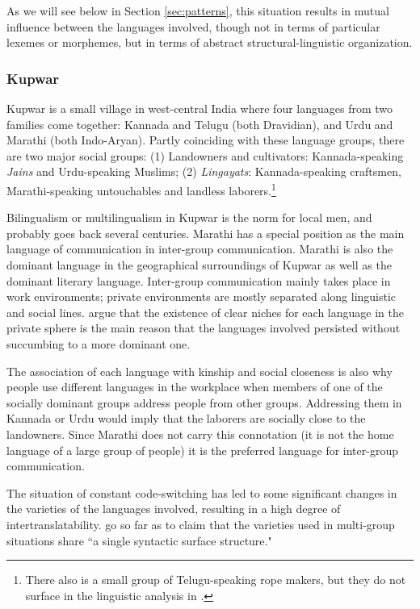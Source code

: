 \documentclass[output=paper]{langscibook}
\begin{document}
As we will see below in Section \ref{sec:patterns}, this situation results in mutual influence between the languages involved, though not in terms of particular lexemes or morphemes, but in terms of abstract structural-linguistic organization.


\subsubsection{Kupwar} \label{Kupwar processes}

Kupwar \parencite{gumperzetal1971convergence} is a small village in west-central India where four languages from two families come together: Kannada and Telugu (both Dravidian), and Urdu and Marathi (both Indo-Aryan). Partly coinciding with these language groups, there are two major social groups: (1) Landowners and cultivators: Kannada-speaking \textit{Jains} and Urdu-speaking Muslims; (2) \textit{Lingayats}: Kannada-speaking craftsmen, Marathi-speaking untouchables and landless laborers.\footnote{There also is a small group of Telugu-speaking rope makers, but they do not surface in the linguistic analysis in \citet{gumperzetal1971convergence}.}

Bilingualism or multilingualism in Kupwar is the norm for local men, and probably goes back several centuries. Marathi has a special position as the main language of communication in inter-group communication. Marathi is also the dominant language in the geographical surroundings of Kupwar as well as the dominant literary language. Inter-group communication mainly takes place in work environments; private environments are mostly separated along linguistic and social lines. \textcite{gumperzetal1971convergence} argue that the existence of clear niches for each language in the private sphere is the main reason that the languages involved persisted without succumbing to a more dominant one.

The association of each language with kinship and social closeness is also why people use different languages in the workplace when members of one of the socially dominant groups address people from other groups. Addressing them in Kannada or Urdu would imply that the laborers are socially close to the landowners. Since Marathi does not carry this connotation (it is not the home language of a large group of people) it is the preferred language for inter-group communication.

The situation of constant code-switching has led to some significant changes in the varieties of the languages involved, resulting in a high degree of intertranslatability. \textcite[155]{gumperzetal1971convergence} go so far as to claim that the varieties used in multi-group situations share ``a single syntactic surface structure."
\end{document}
